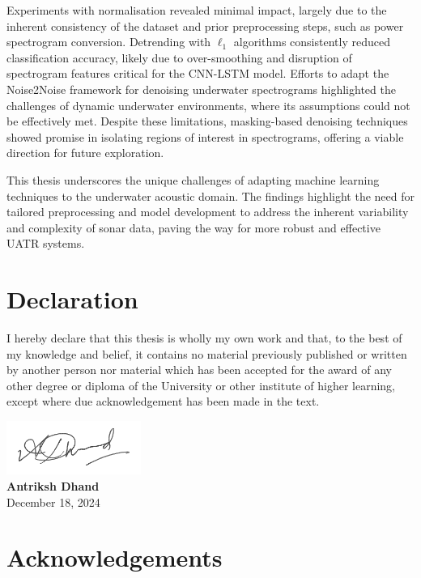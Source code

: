 Experiments with normalisation revealed minimal impact, largely due to the inherent consistency of the dataset and prior preprocessing steps, such as power spectrogram conversion. Detrending with $\ell_1$ algorithms consistently reduced classification accuracy, likely due to over-smoothing and disruption of spectrogram features critical for the CNN-LSTM model. Efforts to adapt the Noise2Noise framework for denoising underwater spectrograms highlighted the challenges of dynamic underwater environments, where its assumptions could not be effectively met. Despite these limitations, masking-based denoising techniques showed promise in isolating regions of interest in spectrograms, offering a viable direction for future exploration.

This thesis underscores the unique challenges of adapting machine learning techniques to the underwater acoustic domain. The findings highlight the need for tailored preprocessing and model development to address the inherent variability and complexity of sonar data, paving the way for more robust and effective UATR systems.

\clearpage\thispagestyle{empty}
\chapter*{Declaration}
\thispagestyle{empty}
I hereby declare that this thesis is wholly my own work and that, to the best of my knowledge and belief, it contains no material previously published or written by another person nor material which has been accepted for the award of any other degree or diploma of the University or other institute of higher learning, except where due acknowledgement has been made in the text.

\vfill

\noindent
\includegraphics[width=0.33\textwidth]{img/ch0_frontmatter/signature.pdf}\\[10pt] \noindent\textbf{Antriksh Dhand}\\[7pt]
\noindent December 18, 2024

\clearpage\thispagestyle{empty}
\chapter*{Acknowledgements}
\thispagestyle{empty}

